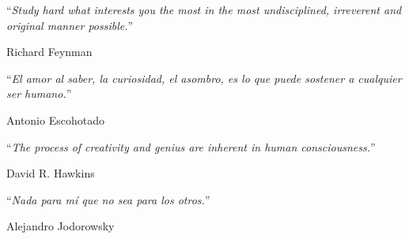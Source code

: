 \documentclass[
11pt, %
english, %
singlespacing, %
headsepline, %
]{MastersDoctoralThesis} %
\theoremstyle{definition}
\theoremstyle{definition} %
\theoremstyle{remark}
\begin{document}
\cleardoublepage


\vspace*{0.1\textheight}

\noindent\enquote{\itshape Study hard what interests you the most in the most undisciplined, irreverent and original manner possible.}
\bigbreak

\hfill Richard Feynman

\vspace*{0.1\textheight}

\noindent\enquote{\itshape El amor al saber, la curiosidad, el asombro, es lo que puede sostener a cualquier ser humano.}\bigbreak
	
\hfill Antonio Escohotado 
	
\vspace*{0.1\textheight}

\noindent\enquote{\itshape The process of creativity and genius are inherent in human consciousness.}\bigbreak 

\hfill David R. Hawkins

\vspace*{0.1\textheight}

\noindent\enquote{\itshape Nada para m\'i que no sea para los otros.}\bigbreak

\hfill Alejandro Jodorowsky



\end{document}
